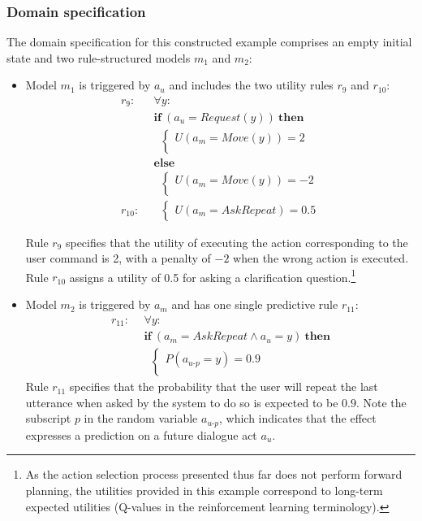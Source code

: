 \subsubsection*{Domain specification}

The domain specification for this constructed example comprises an empty initial state and two rule-structured models $m_1$ and $m_2$: \begin{itemize}
\item Model $m_1$ is triggered by $a_u$ and includes the two utility rules $r_{9}$ and $r_{10}$:
\begin{align*}
r_{9}: \ \ & \forall y: \\ 
& \textbf{if} \ (a_u = Request(y)) \ \textbf{then} \\ 
& \; \; \begin{cases} 
U(a_m = Move(y)) = 2 \\ 
\end{cases} \\
& \textbf{else} \\ 
& \; \; \begin{cases} 
U(a_m = Move(y)) = -2 \\ 
\end{cases} \\[4mm]
r_{10}: \ \ &  \; \; \begin{cases} U(a_m = \mathit{AskRepeat}) = 0.5 \end{cases}
\end{align*}

Rule $r_{9}$ specifies that the utility of executing the action corresponding to the user command is 2, with a penalty of $-2$ when the wrong action is executed. Rule $r_{10}$ assigns a utility of 0.5 for asking a clarification question.\footnote{As the action selection process presented thus far does not perform forward planning, the utilities provided in this example correspond to long-term expected utilities (Q-values in the reinforcement learning terminology).}

\item Model $m_2$ is triggered by $a_m$ and has one single predictive rule $r_{11}$: 
\begin{align*}
r_{11}: \ \ & \forall y: \\ 
& \textbf{if} \ (a_m = \mathit{AskRepeat} \land a_u=y) \ \textbf{then} \\ 
& \; \;  \begin{cases} 
P(a_{u\mbox{-}p} = y) = 0.9 \\ 
\end{cases}
\end{align*}
Rule $r_{11}$ specifies that the probability that the user will repeat the last utterance when asked by the system to do so is expected to be $0.9$. Note the subscript $p$ in the random variable $a_{u\mbox{-}p}$, which indicates that the effect expresses a prediction on a future dialogue act $a_u$.  
\end{itemize}

